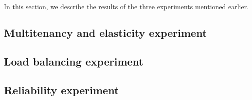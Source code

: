 In this section, we describe the results of the three experiments mentioned earlier.

\subsection{Multitenancy and elasticity experiment}

\subsection{Load balancing experiment}

\subsection{Reliability experiment}